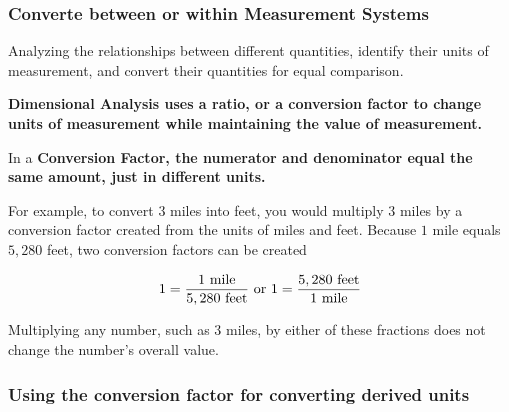 \subsubsection*{Converte between or within Measurement Systems}

\begin{definition} Analyzing the relationships between
  different quantities, identify their units of measurement, and convert their
  quantities for equal comparison.

  \bf{Dimensional Analysis} uses a ratio, or a conversion factor to change
  units of measurement while maintaining the value of measurement.

  In a \bf{Conversion Factor}, the \bf{numerator} and \bf{denominator} equal the same amount, just in different units.

  For example, to convert $3$ miles into feet, you would multiply $3$ miles by
  a conversion factor created from the units of miles and feet. Because $1$
  mile equals $5,280$ feet, two conversion factors can be created

  \begin{align}
    1 = \frac{1 \rm{ mile}}{5,280 \rm{ feet}} \rm{ or } 1 = \frac{5,280 \rm{ feet}}{1 \rm{ mile}}
  \end{align}

  Multiplying any number, such as $3$ miles, by either of these fractions does
  not change the number's overall value.
\end{definition}

\subsubsection*{Using the conversion factor for converting derived units}

\begin{marginfigure}
  \caption{Cube that's $3 \times 3 \times 3$}
  \label{fig:3-3-3-cube}
\end{marginfigure}

